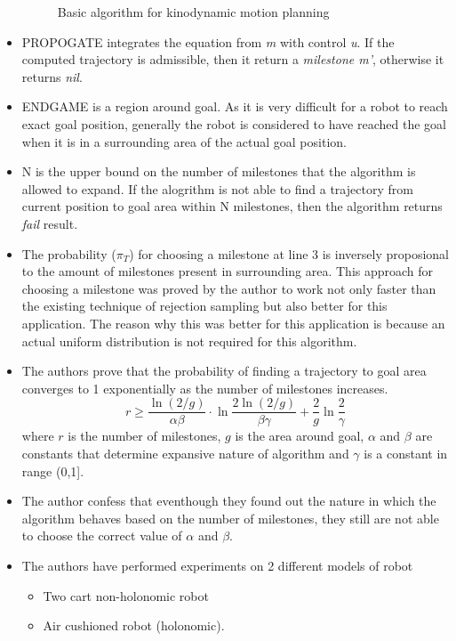 \documentclass[12pt]{article}
\begin{document}
\begin{itemize}
\begin{figure}[ht!]
            \caption{Basic algorithm for kinodynamic motion planning\label{fig:basicAlgo}}
        \end{figure}
    \item PROPOGATE integrates the equation from \textit{m} with control \textit{u}. If the computed trajectory is admissible, then it return a \textit{milestone m'}, otherwise it returns \textit{nil}.
    \item ENDGAME is a region around goal. As it is very difficult for a robot to reach exact goal position, generally the robot is considered to have reached the goal when it is in a surrounding area of the actual goal position.
    \item N is the upper bound on the number of milestones that the algorithm is allowed to expand. If the alogrithm is not able to find a trajectory from current position to goal area within N milestones, then the algorithm returns \textit{fail} result.
    \item The probability ($\pi_T$) for choosing a milestone at line 3 is inversely proposional to the amount of milestones present in surrounding area. This approach for choosing a milestone was proved by the author to work not only faster than the existing technique of rejection sampling but also better for this application. The reason why this was better for this application is because an actual uniform distribution is not required for this algorithm.
    \item The authors prove that the probability of finding a trajectory to goal area converges to 1 exponentially as the number of milestones increases. $$r \ge \frac{\ln(2/g)}{\alpha \beta} \cdot \ln \frac{2\ln(2/g)}{\beta \gamma} + \frac{2}{g}\ln\frac{2}{\gamma}$$
        where $r$ is the number of milestones, $g$ is the area around goal, $\alpha$ and $\beta$ are constants that determine expansive nature of algorithm and $\gamma$ is a constant in range (0,1].
    \item The author confess that eventhough they found out the nature in which the algorithm behaves based on the number of milestones, they still are not able to choose the correct value of $\alpha$ and $\beta$.
    \item The authors have performed experiments on 2 different models of robot
        \begin{itemize}
            \item Two cart non-holonomic robot
            \item Air cushioned robot (holonomic).
        \end{itemize}

\end{itemize}
\end{document}
